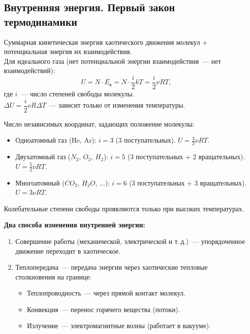 \documentclass[12pt]{article}
\begin{document}
\subsection{Внутренняя энергия. Первый закон термодинамики}

\begin{definition}
	Суммарная кинетическая энергия хаотического движения молекул + потенциальная энергия их взаимодействия.\\
	Для идеального газа (нет потенциальной энергии взаимодействия~--- нет взаимодействий):
	\[
		U = N \cdot \overline{E_{\text{к}}} = N \cdot \frac{i}{2}kT = \frac{i}{2} \nu RT,
	\]
	где $i$~--- число степеней свободы молекулы.\\
	$\Delta U = \dfrac{i}{2}\nu R \Delta T$~--- зависит только от изменения температуры.
\end{definition}

\begin{definition}
	Число независимых координат, задающих положение молекулы:
	\begin{itemize}
		\item Одноатомный газ (He, Ar): $i = 3$ (3 поступательных). $U = \frac{3}{2}\nu RT$.
		\item Двухатомный газ ($N_2$, $O_2$, $H_2$): $i = 5$ (3 поступательных + 2 вращательных). $U = \frac{5}{2}\nu RT$.
		\item Многоатомный ($CO_2$, $H_2O$, ...): $i = 6$ (3 поступательных + 3 вращательных). $U = 3\nu RT$.
	\end{itemize}
	Колебательные степени свободы проявляются только при высоких температурах.
\end{definition}

\textbf{Два способа изменения внутренней энергии:}
\begin{enumerate}
	\item Совершение работы (механической, электрической и т.\,д.)~--- упорядоченное движение переходит в хаотическое.
	\item Теплопередача~--- передача энергии через хаотические тепловые столкновения на границе:
	\begin{itemize}
		\item Теплопроводность~--- через прямой контакт молекул.
		\item Конвекция~--- перенос горячего вещества (потоки).
		\item Излучение~--- электромагнитные волны (работает в вакууме).
	\end{itemize}
\end{enumerate}
\end{document}
